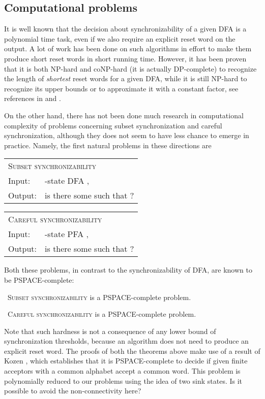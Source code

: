 \documentclass{ws-ijmpc}
\newcommand{\noun}[1]{\textsc{#1}}
\providecommand{\tabularnewline}{\\}
\begin{document}
\subsection{Computational problems}

It is well known that the decision about synchronizability of a given
DFA is a polynomial time task, even if we also require an explicit
reset word on the output. A lot of work has been done on such algorithms
in effort to make them produce short reset words in short running
time. However, it has been proven that it is both NP-hard and coNP-hard
(it is actually DP-complete) to recognize the length of \emph{shortest}
reset words for a given DFA, while it is still NP-hard to recognize
its upper bounds or to approximate it with a constant factor, see
references in \citep{OLS1} and \citep{BER4}.

On the other hand, there has not been done much research in computational
complexity of problems concerning subset synchronization and careful
synchronization, although they does not seem to have less chance to
emerge in practice. Namely, the first natural problems in these directions
are 

\begin{flushleft}
\begin{tabular}{ll}
\multicolumn{2}{l}{\noun{Subset synchronizability}}\tabularnewline
Input: & -state DFA , \tabularnewline
Output: & is there some  such that ?\tabularnewline
\end{tabular}
\par\end{flushleft}

\begin{flushleft}
\begin{tabular}{ll}
\multicolumn{2}{l}{\noun{Careful synchronizability}}\tabularnewline
Input: & -state PFA ,\tabularnewline
Output: & is there some  such that ?\tabularnewline
\end{tabular}
\par\end{flushleft}

Both these problems, in contrast to the synchronizability of DFA,
are known to be PSPACE-complete:
\begin{theorem}
\emph{\cite{NAT1,SAN1short}}\noun{~Subset synchronizability} is
a PSPACE-complete problem.
\end{theorem}

\begin{theorem}
\emph{\cite{MAR4}}\noun{~Careful synchronizability} is a PSPACE-complete
problem.
\end{theorem}
Note that such hardness is not a consequence of any lower bound of
synchronization thresholds, because an algorithm does not need to
produce an explicit reset word. The proofs of both the theorems above
make use of a result of Kozen \citep{KOZ1}, which establishes that
it is PSPACE-complete to decide if given finite acceptors with a common
alphabet accept a common word. This problem is polynomially reduced
to our problems\noun{ }using the idea of two sink states. Is it possible
to avoid the non-connectivity here? 
\end{document}
